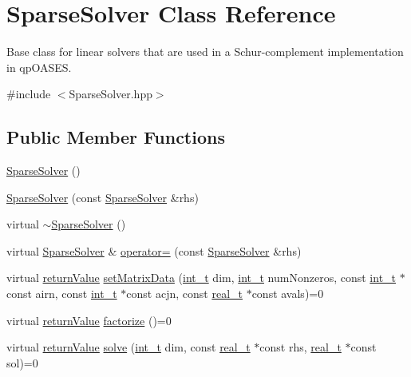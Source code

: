\hypertarget{class_sparse_solver}{}\section{Sparse\+Solver Class Reference}
\label{class_sparse_solver}


Base class for linear solvers that are used in a Schur-\/complement implementation in qp\+O\+A\+S\+ES.  




{\ttfamily \#include $<$Sparse\+Solver.\+hpp$>$}

\subsection*{Public Member Functions}
\begin{DoxyCompactItemize}
\item 
\hyperlink{class_sparse_solver_a2110cd4c01cd32d500d0669f400aa62e}{Sparse\+Solver} ()
\item 
\hyperlink{class_sparse_solver_a4e3fe2c55996dac04f32799ab1c9dfe4}{Sparse\+Solver} (const \hyperlink{class_sparse_solver}{Sparse\+Solver} \&rhs)
\item 
virtual \hyperlink{class_sparse_solver_a3caecef282cba18aa863de94135f9617}{$\sim$\+Sparse\+Solver} ()
\item 
virtual \hyperlink{class_sparse_solver}{Sparse\+Solver} \& \hyperlink{class_sparse_solver_a1215b429a4ca226cac50b67ca78ec78a}{operator=} (const \hyperlink{class_sparse_solver}{Sparse\+Solver} \&rhs)
\item 
virtual \hyperlink{_message_handling_8hpp_a81d556f613bfbabd0b1f9488c0fa865e}{return\+Value} \hyperlink{class_sparse_solver_a875146c92fbf3ea67cfc17233ba391e9}{set\+Matrix\+Data} (\hyperlink{_types_8hpp_ab6fd6105e64ed14a0c9281326f05e623}{int\+\_\+t} dim, \hyperlink{_types_8hpp_ab6fd6105e64ed14a0c9281326f05e623}{int\+\_\+t} num\+Nonzeros, const \hyperlink{_types_8hpp_ab6fd6105e64ed14a0c9281326f05e623}{int\+\_\+t} $\ast$const airn, const \hyperlink{_types_8hpp_ab6fd6105e64ed14a0c9281326f05e623}{int\+\_\+t} $\ast$const acjn, const \hyperlink{qp_o_a_s_e_s__wrapper_8h_a0d00e2b3dfadee81331bbb39068570c4}{real\+\_\+t} $\ast$const avals)=0
\item 
virtual \hyperlink{_message_handling_8hpp_a81d556f613bfbabd0b1f9488c0fa865e}{return\+Value} \hyperlink{class_sparse_solver_a9005259bc966a2339b3dbf9a6229b9f6}{factorize} ()=0
\item 
virtual \hyperlink{_message_handling_8hpp_a81d556f613bfbabd0b1f9488c0fa865e}{return\+Value} \hyperlink{class_sparse_solver_a9d643b71416b4ac87de8bc1a5ac191be}{solve} (\hyperlink{_types_8hpp_ab6fd6105e64ed14a0c9281326f05e623}{int\+\_\+t} dim, const \hyperlink{qp_o_a_s_e_s__wrapper_8h_a0d00e2b3dfadee81331bbb39068570c4}{real\+\_\+t} $\ast$const rhs, \hyperlink{qp_o_a_s_e_s__wrapper_8h_a0d00e2b3dfadee81331bbb39068570c4}{real\+\_\+t} $\ast$const sol)=0

\end{DoxyCompactItemize}
